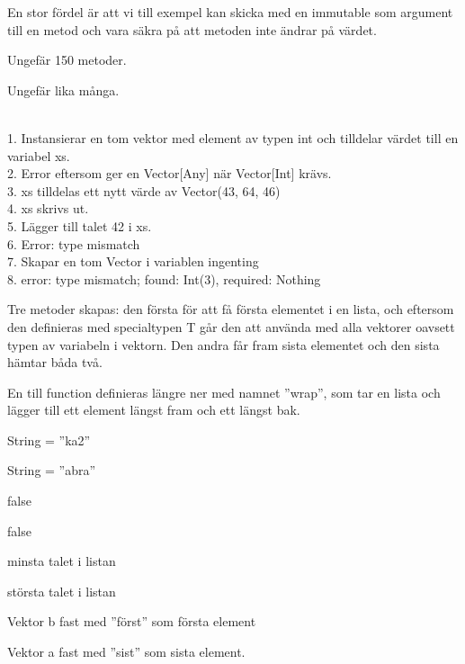\Subtask  En stor fördel är att vi till exempel kan skicka med en immutable som argument till en metod och vara säkra på att metoden inte ändrar på värdet.

\Task %

\Subtask  Ungefär 150 metoder.

\Subtask  Ungefär lika många.

\Task %

\Subtask
\\1. Instansierar en tom vektor med element av typen int och tilldelar värdet till en variabel xs.
\\2. Error eftersom  ger en Vector[Any] när Vector[Int] krävs.
\\3. xs tilldelas ett nytt värde av Vector(43, 64, 46)
\\4. xs skrivs ut.
\\5. Lägger till talet 42 i xs.
\\6. Error: type mismatch
\\7. Skapar en tom Vector i variablen ingenting
\\8. error: type mismatch; found: Int(3), required: Nothing

\Subtask
Tre metoder skapas: den första för att få första elementet i en lista, och eftersom den definieras med specialtypen T går den att använda med alla vektorer oavsett typen av variabeln i vektorn. Den andra får fram sista elementet och den sista hämtar båda två.

En till function definieras längre ner med  namnet ''wrap'', som tar en lista och lägger till ett element längst fram och ett längst bak.

\Task %

\Subtask  String = ''ka2''

\Subtask  String = ''abra''

\Subtask  false

\Subtask  false



\Subtask  minsta talet i listan

\Subtask  största talet i listan



\Subtask  Vektor b fast med ''först'' som första element

\Subtask  Vektor a fast med ''sist'' som sista element.

